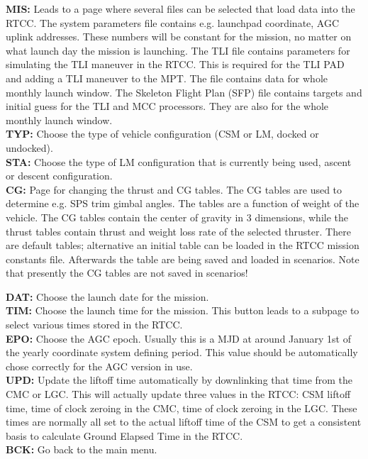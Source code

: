 \documentclass[11pt]{article} %
\begin{document}
\textbf{MIS:} Leads to a page where several files can be selected that load data into the RTCC. The system parameters file contains e.g. launchpad coordinate, AGC uplink addresses. These numbers will be constant for the mission, no matter on what launch day the mission is launching. The TLI file contains parameters for simulating the TLI maneuver in the RTCC. This is required for the TLI PAD and adding a TLI maneuver to the MPT. The file contains data for whole monthly launch window. The Skeleton Flight Plan (SFP) file contains targets and initial guess for the TLI and MCC processors. They are also for the whole monthly launch window.\\
\textbf{TYP:} Choose the type of vehicle configuration (CSM or LM, docked or undocked).\\
\textbf{STA:} Choose the type of LM configuration that is currently being used, ascent or descent configuration.\\
\textbf{CG:} Page for changing the thrust and CG tables. The CG tables are used to determine e.g. SPS trim gimbal angles. The tables are a function of weight of the vehicle. The CG tables contain the center of gravity in 3 dimensions, while the thrust tables contain thrust and weight loss rate of the selected thruster. There are default tables; alternative an initial table can be loaded in the RTCC mission constants file. Afterwards the table are being saved and loaded in scenarios. Note that presently the CG tables are not saved in scenarios!

\textbf{DAT:} Choose the launch date for the mission.\\
\textbf{TIM:} Choose the launch time for the mission. This button leads to a subpage to select various times stored in the RTCC.\\
\textbf{EPO:} Choose the AGC epoch. Usually this is a MJD at around January 1st of the yearly coordinate system defining period. This value should be automatically chose correctly for the AGC version in use.\\
\textbf{UPD:} Update the liftoff time automatically by downlinking that time from the CMC or LGC. This will actually update three values in the RTCC: CSM liftoff time, time of clock zeroing in the CMC, time of clock zeroing in the LGC. These times are normally all set to the actual liftoff time of the CSM to get a consistent basis to calculate Ground Elapsed Time in the RTCC.\\
\textbf{BCK:} Go back to the main menu.\\
\newpage
\end{document}

